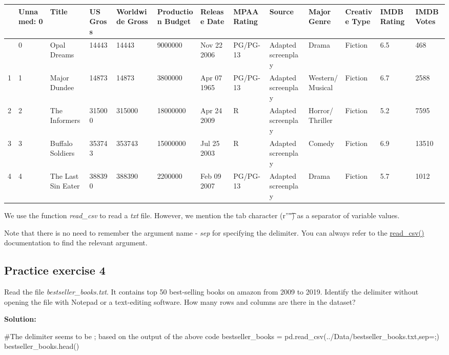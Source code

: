 \documentclass[
  letterpaper,
  DIV=11,
  numbers=noendperiod]{scrreprt}
\newenvironment{Shaded}{\begin{snugshade}}{\end{snugshade}}
\newcommand{\CommentTok}[1]{\textcolor[rgb]{0.37,0.37,0.37}{#1}}
\newcommand{\NormalTok}[1]{\textcolor[rgb]{0.00,0.23,0.31}{#1}}
\newcommand{\OperatorTok}[1]{\textcolor[rgb]{0.37,0.37,0.37}{#1}}
\newcommand{\StringTok}[1]{\textcolor[rgb]{0.13,0.47,0.30}{#1}}
\begin{document}
\begin{longtable}[]{@{}lllllllllllll@{}}
\toprule\noalign{}
& Unnamed: 0 & Title & US Gross & Worldwide Gross & Production Budget &
Release Date & MPAA Rating & Source & Major Genre & Creative Type & IMDB
Rating & IMDB Votes \\
\midrule\noalign{}
\endhead
\bottomrule\noalign{}
\endlastfoot
0 & 0 & Opal Dreams & 14443 & 14443 & 9000000 & Nov 22 2006 & PG/PG-13 &
Adapted screenplay & Drama & Fiction & 6.5 & 468 \\
1 & 1 & Major Dundee & 14873 & 14873 & 3800000 & Apr 07 1965 & PG/PG-13
& Adapted screenplay & Western/Musical & Fiction & 6.7 & 2588 \\
2 & 2 & The Informers & 315000 & 315000 & 18000000 & Apr 24 2009 & R &
Adapted screenplay & Horror/Thriller & Fiction & 5.2 & 7595 \\
3 & 3 & Buffalo Soldiers & 353743 & 353743 & 15000000 & Jul 25 2003 & R
& Adapted screenplay & Comedy & Fiction & 6.9 & 13510 \\
4 & 4 & The Last Sin Eater & 388390 & 388390 & 2200000 & Feb 09 2007 &
PG/PG-13 & Adapted screenplay & Drama & Fiction & 5.7 & 1012 \\
\end{longtable}

We use the function \emph{read\_csv} to read a \emph{txt} file. However,
we mention the tab character (r''\t") as a separator of variable values.

Note that there is no need to remember the argument name - \emph{sep}
for specifying the delimiter. You can always refer to the
\href{https://pandas.pydata.org/docs/reference/api/pandas.read_csv.html}{read\_csv()}
documentation to find the relevant argument.

\hypertarget{practice-exercise-4-1}{%
\subsection{Practice exercise 4}\label{practice-exercise-4-1}}

Read the file \emph{bestseller\_books.txt}. It contains top 50
best-selling books on amazon from 2009 to 2019. Identify the delimiter
without opening the file with Notepad or a text-editing software. How
many rows and columns are there in the dataset?

\textbf{Solution:}

\begin{Shaded}
\begin{Highlighting}[]
\CommentTok{\#The delimiter seems to be \textquotesingle{};\textquotesingle{} based on the output of the above code}
\NormalTok{bestseller\_books }\OperatorTok{=}\NormalTok{ pd.read\_csv(}\StringTok{\textquotesingle{}../Data/bestseller\_books.txt\textquotesingle{}}\NormalTok{,sep}\OperatorTok{=}\StringTok{\textquotesingle{};\textquotesingle{}}\NormalTok{)}
\NormalTok{bestseller\_books.head()}
\end{Highlighting}
\end{Shaded}
\end{document}
